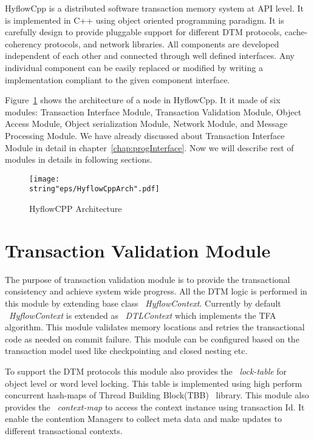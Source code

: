 \documentclass[12pt,english]{report}
\begin{document}
HyflowCpp is a distributed software transaction memory system at API level. It is implemented in C++ using object oriented programming paradigm. It is carefully design to provide pluggable support for different DTM protocols, cache-coherency protocols, and network libraries. All components are developed independent of each other and connected through well defined interfaces. Any individual component can be easily replaced or modified by writing a implementation compliant to the given component interface. 

Figure~\ref{Fig:HyflowCppArch} shows the architecture of a node in HyflowCpp. It it made of six modules: Transaction Interface Module, Transaction Validation Module, Object Access Module, Object serialization Module, Network Module, and Message Processing Module. We have already discussed about Transaction Interface Module in detail in chapter~\ref{chap:progInterface}. Now we will describe rest of modules in details in following sections.

\begin{figure}
\begin{minipage}[b]{0.9\linewidth}\centering
\centering \texttt{[image: \\string"eps/HyflowCppArch".pdf]}
\caption{HyflowCPP Architecture}
\label{Fig:HyflowCppArch}
\end{minipage}
\end{figure}

\section{Transaction Validation Module}

The purpose of transaction validation module is to provide the transactional consistency and achieve system wide progress. All the DTM logic is performed in this module by extending base class ~\emph{HyflowContext}. Currently by default ~\emph{HyflowContext} is extended as ~\emph{DTLContext} which implements the TFA algorithm. This module validates memory locations and retries the transactional code as needed on commit failure. This module can be configured based on the transaction model used like checkpointing and closed nesting etc. 

To support the DTM protocols this module also provides the ~\emph{lock-table} for object level or word level locking. This table is implemented using high perform concurrent hash-maps of Thread Building Block(TBB)~\cite{willhalm2008putting} library. This module also provides the ~\emph{context-map} to access the context instance using transaction Id. It enable the contention Managers to collect meta data and make updates to different transactional contexts.
\end{document}

